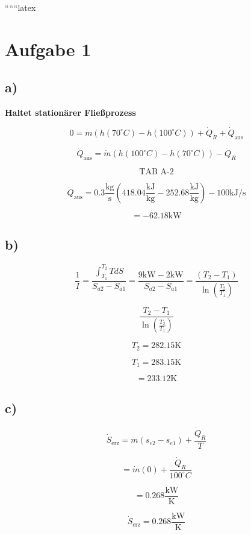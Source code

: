 
``````latex


\section*{Aufgabe 1}

\subsection*{a)}
\textbf{Haltet stationärer Fließprozess}

\[
0 = \dot{m} \left( h(70^\circ C) - h(100^\circ C) \right) + \dot{Q}_R + \dot{Q}_{\text{aus}}
\]

\[
\dot{Q}_{\text{aus}} = \dot{m} \left( h(100^\circ C) - h(70^\circ C) \right) - \dot{Q}_R
\]

\[
\text{TAB A-2}
\]

\[
\dot{Q}_{\text{aus}} = 0.3 \frac{\text{kg}}{\text{s}} \left( 418.04 \frac{\text{kJ}}{\text{kg}} - 252.68 \frac{\text{kJ}}{\text{kg}} \right) - 100 \text{kJ/s}
\]

\[
= -62.18 \text{kW}
\]

\subsection*{b)}

\[
\frac{1}{I} = \frac{\int_{T_1}^{T_2} T dS}{S_{a2} - S_{a1}} = \frac{9 \text{kW} - 2 \text{kW}}{S_{a2} - S_{a1}} = \frac{(T_2 - T_1)}{\ln \left( \frac{T_2}{T_1} \right)}
\]

\[
\frac{T_2 - T_1}{\ln \left( \frac{T_2}{T_1} \right)}
\]

\[
T_2 = 282.15 \text{K}
\]

\[
T_1 = 283.15 \text{K}
\]

\[
= 233.12 \text{K}
\]

\subsection*{c)}

\[
\dot{S}_{\text{erz}} = \dot{m} (s_{e2} - s_{e1}) + \frac{\dot{Q}_R}{T}
\]

\[
= \dot{m} (0) + \frac{\dot{Q}_R}{100^\circ C}
\]

\[
= 0.268 \frac{\text{kW}}{\text{K}}
\]


\[
\dot{S}_{\text{erz}} = 0.268 \frac{\text{kW}}{\text{K}}
\]

